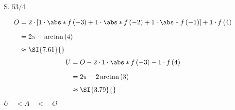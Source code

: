 \begin{Exercise}{S. 53/4}{}
\begin{enumerate}[leftmargin=*]
{{
        }
        \begin{align*}
            O &= 2 \cdot \left[1 \cdot \abs*{f\left(-3\right)} + 1 \cdot \abs*{f\left(-2\right)} + 1 \cdot \abs*{f\left(-1\right)} \right] + 1 \cdot f\left(4\right)&& \\[1.5ex]
            &= 2\pi + \arctan\left(4\right) && \\[1.0ex]
            &\approx \SI{7.61}{} &&
        \end{align*}
        \begin{align*}
            U &= O - 2 \cdot 1 \cdot \abs*{f\left(-3\right)} - 1 \cdot f\left(4\right) && \\[1.5ex]
            &= 2\pi - 2 \arctan\left(3\right) && \\[1.0ex]
            &\approx \SI{3.79}{} &&
        \end{align*}
        $U \quad < A \quad < \quad O$
        }
\end{enumerate}
\end{Exercise}
